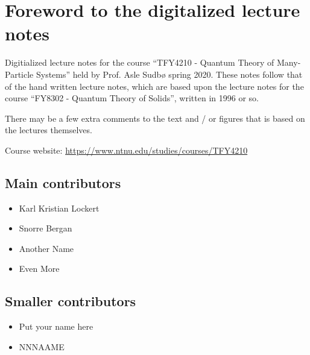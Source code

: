 \section*{Foreword to the digitalized lecture notes}

Digitialized lecture notes for the course ``TFY4210 - Quantum Theory of Many-Particle Systems'' held by Prof. Asle Sudbø spring 2020. These notes follow that of the hand written lecture notes, which are based upon the lecture notes for the course ``FY8302 - Quantum Theory of Solids'', written in 1996 or so. 

There may be a few extra comments to the text and / or figures that is based on the lectures themselves. 


Course website: \href{https://www.ntnu.edu/studies/courses/TFY4210}{https://www.ntnu.edu/studies/courses/TFY4210}



\subsection*{Main contributors}
	\begin{multicols}{2}
\begin{itemize} 
	\item Karl Kristian Lockert
	\item Snorre Bergan
	\item Another Name
	\item Even More
\end{itemize}
\end{multicols}

\subsection*{Smaller contributors}
\begin{multicols}{2}
\begin{itemize}
	\item Put your name here
	\item NNNAAME
\end{itemize}
\end{multicols}

